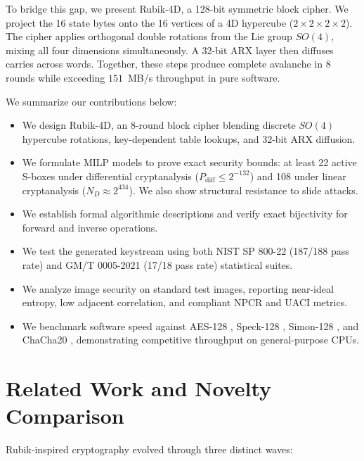 \documentclass[10pt,twocolumn]{article}
\begin{document}
To bridge this gap, we present Rubik-4D, a 128-bit symmetric block cipher. We project the 16 state bytes onto the 16 vertices of a 4D hypercube ($2 \times 2 \times 2 \times 2$). The cipher applies orthogonal double rotations from the Lie group $SO(4)$, mixing all four dimensions simultaneously. A 32-bit ARX layer then diffuses carries across words. Together, these steps produce complete avalanche in 8 rounds while exceeding $151$~MB/s throughput in pure software.

We summarize our contributions below:
\begin{itemize}
    \item We design Rubik-4D, an 8-round block cipher blending discrete $SO(4)$ hypercube rotations, key-dependent table lookups, and 32-bit ARX diffusion.
    \item We formulate MILP models to prove exact security bounds: at least 22 active S-boxes under differential cryptanalysis ($P_{\text{diff}} \le 2^{-132}$) and 108 under linear cryptanalysis ($N_D \approx 2^{434}$). We also show structural resistance to slide attacks.
    \item We establish formal algorithmic descriptions and verify exact bijectivity for forward and inverse operations.
    \item We test the generated keystream using both NIST SP 800-22 (187/188 pass rate) and GM/T 0005-2021 (17/18 pass rate) statistical suites.
    \item We analyze image security on standard test images, reporting near-ideal entropy, low adjacent correlation, and compliant NPCR and UACI metrics.
    \item We benchmark software speed against AES-128 \cite{nist2001fips}, Speck-128 \cite{beaulieu2015simon}, Simon-128 \cite{beaulieu2015simon}, and ChaCha20 \cite{nir2018chacha20}, demonstrating competitive throughput on general-purpose CPUs.
\end{itemize}

\section{Related Work and Novelty Comparison}
\label{sec:related_work}

Rubik-inspired cryptography evolved through three distinct waves:
\end{document}
